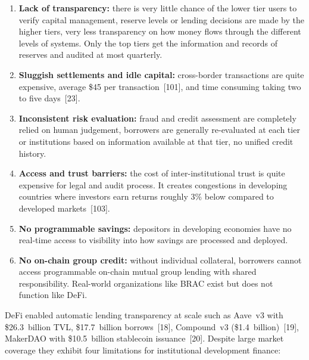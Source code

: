 \begin{enumerate}[noitemsep]
\item \textbf{Lack of transparency:} there is very little chance of the lower tier users to verify capital management, reserve levels or lending decisions are made by the higher tiers, very less transparency on how money flows through the different levels of systems. Only the top tiers get the information and records of reserves and audited at most quarterly.
\item \textbf{Sluggish settlements and idle capital:} cross-border transactions are quite expensive, average \$45 per transaction~[101], and time consuming taking two to five days~[23].
\item \textbf{Inconsistent risk evaluation:} fraud and credit assessment are completely relied on human judgement, borrowers are generally re-evaluated at each tier or institutions based on information available at that tier, no unified credit history.
\item \textbf{Access and trust barriers:} the cost of inter-institutional trust is quite expensive for legal and audit process. It creates congestions in developing countries where investors earn returns roughly 3\% below compared to developed markets~[103].
\item \textbf{No programmable savings:} depositors in developing economies have no real-time access to visibility into how savings are processed and deployed.
\item \textbf{No on-chain group credit:} without individual collateral, borrowers cannot access programmable on-chain mutual group lending with shared responsibility. Real-world organizations like BRAC exist but does not function like DeFi.
\end{enumerate}

DeFi enabled automatic lending transparency at scale such as Aave~v3 with \$26.3~billion TVL, \$17.7~billion borrows~[18], Compound~v3 (\$1.4~billion)~[19], MakerDAO with \$10.5~billion stablecoin issuance~[20]. Despite large market coverage they exhibit four limitations for institutional development finance:

